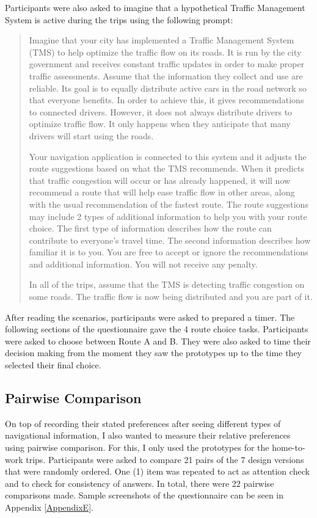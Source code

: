 Participants were also asked to imagine that a hypothetical Traffic Management System is active during the trips using the following prompt:
\begin{quote}
    Imagine that your city has implemented a Traffic Management System (TMS) to help optimize the traffic flow on its roads. It is run by the city government and receives constant traffic updates in order to make proper traffic assessments. Assume that the information they collect and use are reliable. Its goal is to equally distribute active cars in the road network so that everyone benefits. In order to achieve this, it gives recommendations to connected drivers. However, it does not always distribute drivers to optimize traffic flow. It only happens when they anticipate that many drivers will start using the roads. 

    Your navigation application is connected to this system and it adjusts the route suggestions based on what the TMS recommends. When it predicts that traffic congestion will occur or has already happened, it will now recommend a route that will help ease traffic flow in other areas, along with the usual recommendation of the fastest route. The route suggestions may include 2 types of additional information to help you with your route choice. The first type of information describes how the route can contribute to everyone's travel time. The second information describes how familiar it is to you. You are free to accept or ignore the recommendations and additional information. You will not receive any penalty. 

    In all of the trips, assume that the TMS is detecting traffic congestion on some roads. The traffic flow is now being distributed and you are part of it.
\end{quote}

After reading the scenarios, participants were asked to prepared a timer. The following sections of the questionnaire gave the 4 route choice tasks. Participants were asked to choose between Route A and B. They were also asked to time their decision making from the moment they saw the prototypes up to the time they selected their final choice.

\subsection{Pairwise Comparison}
On top of recording their stated preferences after seeing different types of navigational information, I also wanted to measure their relative preferences using pairwise comparison. For this, I only used the prototypes for the home-to-work trips. Participants were asked to compare 21 pairs of the 7 design versions that were randomly ordered. One (1) item was repeated to act as attention check and to check for consistency of answers. In total, there were 22 pairwise comparisons made. Sample screenshots of the questionnaire can be seen in Appendix \ref{AppendixE}.

